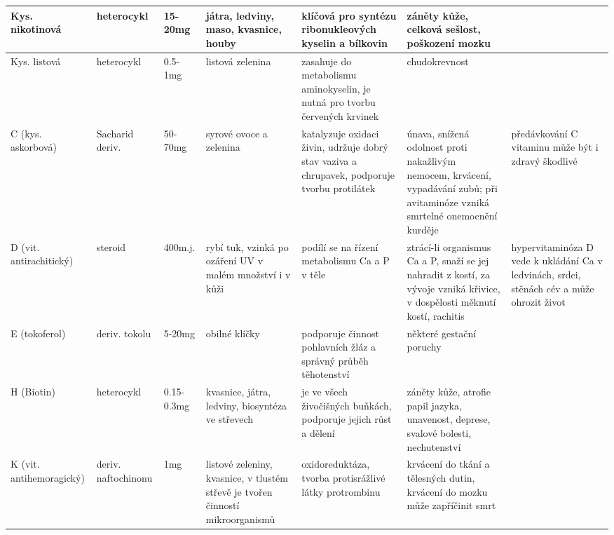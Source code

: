 \begin{landscape}
\begin{longtable}{| m{7em} | m{5em} | m{5em} | m{8em}<{\RaggedRight} | m{15em}<{\RaggedRight} | m{15em}<{\RaggedRight} | m{10em}<{\RaggedRight} |}
        \hline
        Kys. nikotinová & heterocykl & 15-20mg & játra, ledviny, maso, kvasnice, houby & klíčová pro syntézu ribonukleových kyselin a bílkovin & záněty kůže, celková sešlost, poškození mozku& \\
        \hline
        Kys. listová & heterocykl & 0.5-1mg & listová zelenina & zasahuje do metabolismu aminokyselin, je nutná pro tvorbu červených krvinek & chudokrevnost & \\
        \hline
        C (kys. askorbová) & Sacharid deriv. & 50-70mg & syrové ovoce a zelenina & katalyzuje oxidaci živin, udržuje dobrý stav vaziva a chrupavek, podporuje tvorbu protilátek & únava, snížená odolnost proti nakažlivým nemocem, krvácení, vypadávání zubů; při avitaminóze vzniká smrtelné onemocnění kurděje & předávkování C vitaminu může být i zdravý škodlivé \\
        \hline
        D (vit. antirachitický) & steroid & 400m.j. & rybí tuk, vzinká po ozáření UV v malém množství i v kůži & podílí se na řízení metabolismu Ca a P v těle & ztrácí-li organismus Ca a P, snaží se jej nahradit z kostí, za vývoje vzniká křivice, v dospělosti měknutí kostí, rachitis & hypervitaminóza D vede k ukládání Ca v ledvinách, srdci, stěnách cév a může ohrozit život \\
        \hline
        E (tokoferol) & deriv. tokolu & 5-20mg & obilné klíčky & podporuje činnost pohlavních žláz a správný průběh těhotenství & některé gestační poruchy & \\
        \hline
        H (Biotin) & heterocykl & 0.15-0.3mg & kvasnice, játra, ledviny, biosyntéza ve střevech & je ve všech živočišných buňkách, podporuje jejich růst a dělení & záněty kůže, atrofie papil jazyka, unavenost, deprese, svalové bolesti, nechutenství & \\
        \hline
        K (vit. antihemoragický) & deriv. naftochinonu & 1mg & listové zeleniny, kvasnice, v tlustém střevě je tvořen činností mikroorganismů & oxidoreduktáza, tvorba protisrážlivé látky protrombinu & krvácení do tkání a tělesných dutin, krvácení do mozku může zapříčinit smrt & \\
        \hline
    \end{longtable}
\end{landscape}
